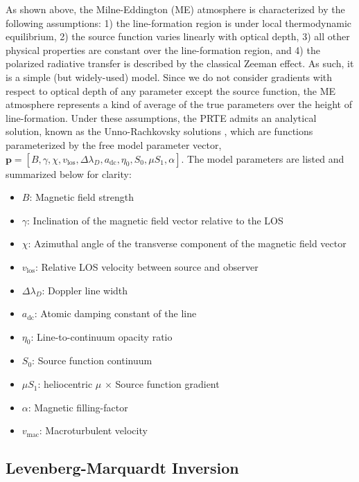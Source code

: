 \documentclass[11pt]{article}
\begin{document}
As shown above, the Milne-Eddington (ME) atmosphere is characterized by the following
assumptions: 1) the line-formation region is under local thermodynamic equilibrium,
2) the source function varies linearly with optical depth, 3) all other physical
properties are constant over the line-formation region, and 4) the polarized radiative
transfer is described by the classical Zeeman effect.  As such, it is a simple
(but widely-used) model.  Since we do not consider gradients with respect to optical depth
of any parameter except the source function, the ME atmosphere represents a kind of average
of the true parameters over the height of line-formation.  Under these assumptions, the PRTE
admits an analytical solution, known as the Unno-Rachkovsky solutions
\citep{unno:1956,rachkovsky:1962,rachkovsky:1963,rachkovsky:1967},
which are functions parameterized by the free model parameter vector,
$\mathbf{p} = [B,\gamma,\chi,v_{\mathrm{los}},\Delta\lambda_{D},a_{\mathrm{dc}},\eta_{0},S_{0},\mu S_{1},\alpha]$.
The model parameters are listed and summarized below for clarity:

\begin{itemize}
  \renewcommand\labelitemi{\scriptsize$\blacksquare$}
  \item $B$: Magnetic field strength
  \item $\gamma$: Inclination of the magnetic field vector relative to the LOS
  \item $\chi$: Azimuthal angle of the transverse component of the magnetic field vector
  \item $v_{\mathrm{los}}$: Relative LOS velocity between source and observer
  \item $\Delta\lambda_{D}$: Doppler line width
  \item $a_{\mathrm{dc}}$: Atomic damping constant of the line
  \item $\eta_{0}$: Line-to-continuum opacity ratio
  \item $S_{0}$: Source function continuum
  \item $\mu S_{1}$: heliocentric $\mu$ $\times$ Source function gradient
  \item $\alpha$: Magnetic filling-factor
  \item $v_{\mathrm{mac}}$: Macroturbulent velocity
\end{itemize}

\subsection{Levenberg-Marquardt Inversion}\label{s:lm}
\end{document}
